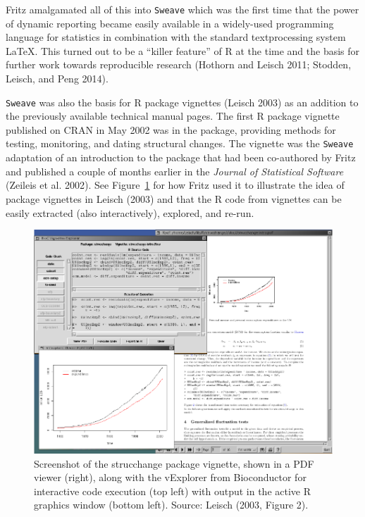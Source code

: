 Fritz amalgamated all of this into \texttt{Sweave} which was the first time that the
power of dynamic reporting became easily available in a widely-used programming
language for statistics in combination with the standard textprocessing system
LaTeX. This turned out to be a ``killer feature'' of R at the time and the basis
for further work towards reproducible research (Hothorn and Leisch 2011; Stodden, Leisch, and Peng 2014).

\texttt{Sweave} was also the basis for R package vignettes (Leisch 2003) as an
addition to the previously available technical manual pages.
The first R package vignette published on CRAN in May 2002 was in the
 package, providing methods for testing, monitoring,
and dating structural changes. The vignette was the \texttt{Sweave} adaptation
of an introduction to the package that had been co-authored by Fritz and
published a couple of months earlier in the \emph{Journal of Statistical Software}
(Zeileis et al. 2002). See Figure~\ref{fig:sweave} for how
Fritz used it to illustrate the idea of package vignettes in Leisch (2003)
and that the R code from vignettes can be easily extracted (also interactively),
explored, and re-run.

\begin{figure}[t!]

{\centering \includegraphics[width=1\linewidth]{fritz_files/figure-latex/sweave-1} 

}

\caption{Screenshot of the strucchange package vignette, shown in a PDF viewer (right), along with the vExplorer from Bioconductor for interactive code execution (top left) with output in the active R graphics window (bottom left). Source: Leisch (2003, Figure 2).}\label{fig:sweave}
\end{figure}

